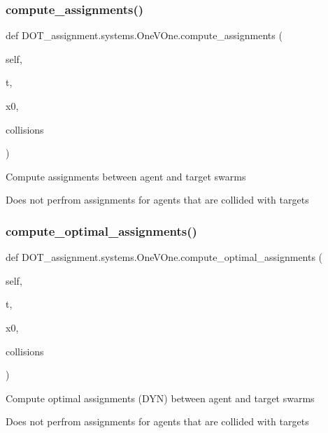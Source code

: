 \subsubsection{\texorpdfstring{compute\_assignments()}{compute\_assignments()}}
{\footnotesize\ttfamily def D\+O\+T\+\_\+assignment.\+systems.\+One\+V\+One.\+compute\+\_\+assignments (\begin{DoxyParamCaption}\item[{}]{self,  }\item[{}]{t,  }\item[{}]{x0,  }\item[{}]{collisions }\end{DoxyParamCaption})}

\begin{DoxyVerb}Compute assignments between agent and target swarms

Does not perfrom assignments for agents that are collided with targets\end{DoxyVerb}
 \mbox{\label{class_d_o_t__assignment_1_1systems_1_1_one_v_one_ad4469fcccbebd08f45e7b9a2187b96a5}} 
\subsubsection{\texorpdfstring{compute\_optimal\_assignments()}{compute\_optimal\_assignments()}}
{\footnotesize\ttfamily def D\+O\+T\+\_\+assignment.\+systems.\+One\+V\+One.\+compute\+\_\+optimal\+\_\+assignments (\begin{DoxyParamCaption}\item[{}]{self,  }\item[{}]{t,  }\item[{}]{x0,  }\item[{}]{collisions }\end{DoxyParamCaption})}

\begin{DoxyVerb}Compute optimal assignments (DYN) between agent and target swarms

Does not perfrom assignments for agents that are collided with targets\end{DoxyVerb}
 \mbox{\label{class_d_o_t__assignment_1_1systems_1_1_one_v_one_a4056ed3fbb2f274091018b67b9183348}} 
